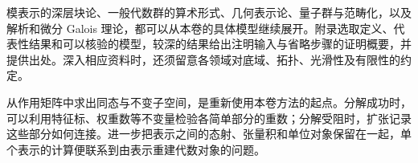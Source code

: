 \ProseParagraphBreak
模表示的深层块论、一般代数群的算术形式、几何表示论、量子群与范畴化，以及解析和微分 Galois 理论，都可以从本卷的具体模型继续展开。附录选取定义、代表性结果和可以核验的模型，较深的结果给出注明输入与省略步骤的证明概要，并提供出处。深入相应资料时，还须留意各领域对底域、拓扑、光滑性及有限性的约定。

\ProseParagraphBreak
从作用矩阵中求出同态与不变子空间，是重新使用本卷方法的起点。分解成功时，可以利用特征标、权重数等不变量检验各简单部分的重数；分解受阻时，扩张记录这些部分如何连接。进一步把表示之间的态射、张量积和单位对象保留在一起，单个表示的计算便联系到由表示重建代数对象的问题。
